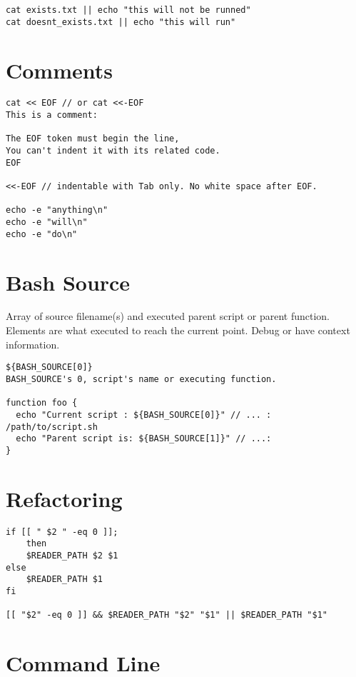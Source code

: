 \begin{verbatim}
cat exists.txt || echo "this will not be runned" 
cat doesnt_exists.txt || echo "this will run" 
\end{verbatim}

\section{Comments}

\begin{verbatim}
cat << EOF // or cat <<-EOF
This is a comment:

The EOF token must begin the line,
You can't indent it with its related code. 
EOF

<<-EOF // indentable with Tab only. No white space after EOF.

echo -e "anything\n"
echo -e "will\n"
echo -e "do\n"
\end{verbatim}

\section{Bash Source}

Array of source filename(s) and executed parent script or parent function.
Elements are what executed to reach the current point.
Debug or have context information.

\begin{verbatim}
${BASH_SOURCE[0]}
BASH_SOURCE's 0, script's name or executing function.

function foo {
  echo "Current script : ${BASH_SOURCE[0]}" // ... : /path/to/script.sh
  echo "Parent script is: ${BASH_SOURCE[1]}" // ...: 
}
\end{verbatim}

\section{Refactoring}

\begin{verbatim}
if [[ " $2 " -eq 0 ]];
    then
    $READER_PATH $2 $1
else
    $READER_PATH $1
fi

[[ "$2" -eq 0 ]] && $READER_PATH "$2" "$1" || $READER_PATH "$1"
\end{verbatim}

\section{Command Line}

